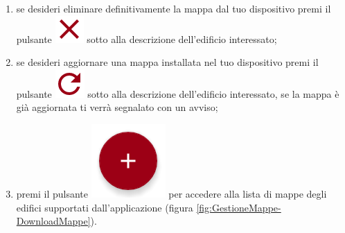 \documentclass[../ClipsManualeUtente.tex]{subfiles}
\begin{document}
\begin{enumerate}
			\item se desideri eliminare definitivamente la mappa dal tuo dispositivo premi il pulsante \includegraphics[scale=0.5]{img2/GestioneMappe-EliminaMappaPulsante} sotto alla descrizione dell'edificio interessato;
			\item se desideri aggiornare una mappa installata nel tuo dispositivo premi il pulsante \includegraphics[scale=0.5]{img2/GestioneMappe-AggiornaMappaPulsante} sotto alla descrizione dell'edificio interessato, se la mappa è già aggiornata ti verrà segnalato con un avviso;
			\item premi il pulsante \includegraphics[scale=0.3]{img2/GestioneMappe-DownloadMappePulsante} per accedere alla lista di mappe degli edifici supportati dall'applicazione (figura \ref{fig:GestioneMappe-DownloadMappe}).
		\end{enumerate}
		
\end{document}
